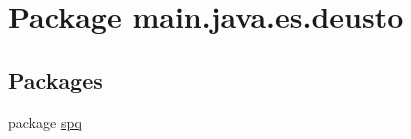 \hypertarget{namespacemain_1_1java_1_1es_1_1deusto}{}\section{Package main.\+java.\+es.\+deusto}
\label{namespacemain_1_1java_1_1es_1_1deusto}
\subsection*{Packages}
\begin{DoxyCompactItemize}
\item 
package \hyperlink{namespacemain_1_1java_1_1es_1_1deusto_1_1spq}{spq}
\end{DoxyCompactItemize}
